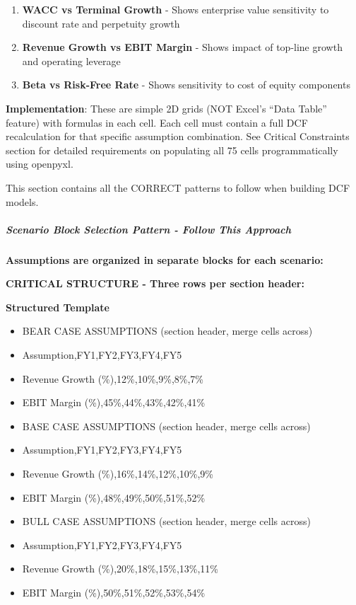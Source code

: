 \documentclass[11pt]{article}
\begin{document}
\begin{enumerate}[leftmargin=*,itemsep=2pt,topsep=2pt]
\item {} \textbf{WACC vs Terminal Growth} - Shows enterprise value sensitivity to discount rate and perpetuity growth
\item {} \textbf{Revenue Growth vs EBIT Margin} - Shows impact of top-line growth and operating leverage
\item {} \textbf{Beta vs Risk-Free Rate} - Shows sensitivity to cost of equity components
\end{enumerate}

\textbf{Implementation}: These are simple 2D grids (NOT Excel's ``Data Table'' feature) with formulas in each cell. Each cell must contain a full DCF recalculation for that specific assumption combination. See Critical Constraints section for detailed requirements on populating all 75 cells programmatically using openpyxl.





This section contains all the CORRECT patterns to follow when building DCF models.


\subparagraph{Scenario Block Selection Pattern - Follow This Approach}\mbox{}\par

\textbf{Assumptions are organized in separate blocks for each scenario:}


\textbf{CRITICAL STRUCTURE - Three rows per section header:}


\textbf{Structured Template}
\begin{itemize}[leftmargin=*,itemsep=2pt,topsep=2pt]
\item {} BEAR CASE ASSUMPTIONS (section header, merge cells across)
\item {} Assumption,FY1,FY2,FY3,FY4,FY5
\item {} Revenue Growth (\%),12\%,10\%,9\%,8\%,7\%
\item {} EBIT Margin (\%),45\%,44\%,43\%,42\%,41\%
\item {} BASE CASE ASSUMPTIONS (section header, merge cells across)
\item {} Assumption,FY1,FY2,FY3,FY4,FY5
\item {} Revenue Growth (\%),16\%,14\%,12\%,10\%,9\%
\item {} EBIT Margin (\%),48\%,49\%,50\%,51\%,52\%
\item {} BULL CASE ASSUMPTIONS (section header, merge cells across)
\item {} Assumption,FY1,FY2,FY3,FY4,FY5
\item {} Revenue Growth (\%),20\%,18\%,15\%,13\%,11\%
\item {} EBIT Margin (\%),50\%,51\%,52\%,53\%,54\%
\end{itemize}
\end{document}
